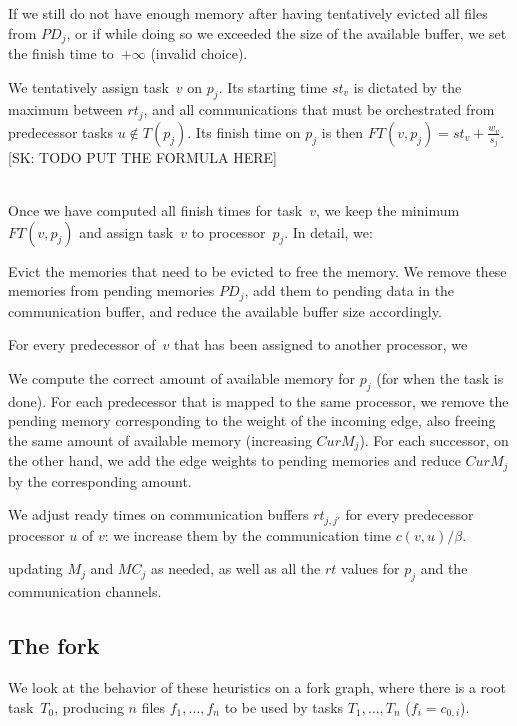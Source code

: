 \documentclass[sigconf,review,anonymous]{acmart}
\newcommand{\MM}{M}
\newcommand{\MC}{MC}
\newcommand{\PD}{PD}
\newcommand{\skug}[1]{{\color{blue}[SK: #1]}}
\begin{document}
If we still do not have enough memory after having tentatively evicted all files from $\PD_j$,
    or if while doing so we exceeded the size of the available buffer,
we set the finish time to~$+\infty$ (invalid choice). 

\smallskip
{} We tentatively assign task~$v$ on $p_j$. Its starting time $st_v$
is dictated by the maximum between $rt_j$, and all communications that
must be orchestrated from predecessor tasks $u\notin T(p_j)$. Its
finish time on $p_j$ is then 
$FT(v,p_j) = st_v + \frac{w_v}{s_j}$.
    \skug {TODO PUT THE FORMULA HERE}


\medskip
{}\\
Once we have computed all finish times for task~$v$, 
we keep the minimum $FT(v,p_j)$ and assign task~$v$
to processor~$p_j$.
In detail, we:

    \textbullet
    Evict the memories that need to be evicted to free the memory. We remove these memories from pending memories
        $PD_j$, add them to pending data in the communication buffer, and reduce the available buffer size accordingly.

    \textbullet For every predecessor of~$v$ that has been assigned to another processor, we

    \textbullet We compute the correct amount of available memory for $p_j$ (for when the task is done).
For each predecessor that is mapped to the same processor, we remove the pending memory corresponding to the weight of
    the incoming edge, also freeing the same amount of available memory (increasing $CurM_j$).
For each successor, on the other hand, we add the edge weights to pending memories and reduce $CurM_j$ by the corresponding
    amount.

    \textbullet
We adjust ready times on communication buffers $rt_{j, j'}$ for every predecessor processor $u$ of $v$: we increase them by the
    communication time $c(v, u) / \beta$.

    updating $\MM_j$ and $\MC_j$ as needed,
as well as all the $rt$ values for $p_j$ and the communication channels.



\subsection{The fork}
We look at the behavior of these heuristics on a fork graph,
where there is a root task~$T_0$, producing $n$ files $f_1, \ldots, f_n$
to be used by tasks $T_1, \ldots, T_n$ ($f_i = c_{0,i}$).
\end{document}
